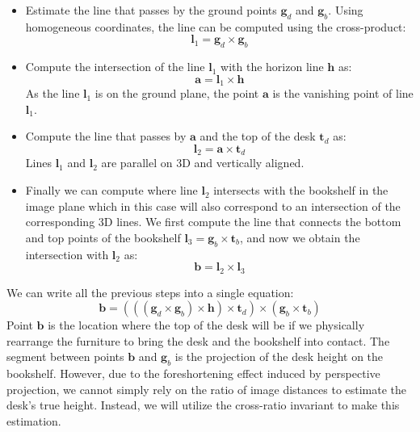 \begin{itemize}
\item Estimate the line that passes by the ground points $\mathbf{g}_d$ and $\mathbf{g}_b$. Using homogeneous coordinates, the line can be computed using the cross-product:
\begin{equation}
\boldsymbol{l}_1 = \mathbf{g}_d \times \mathbf{g}_b
\end{equation}

\item Compute the intersection of the line $\boldsymbol{l}_1$ with the horizon line $\mathbf{h}$ as:
\begin{equation}
\mathbf{a} = \boldsymbol{l}_1 \times \mathbf{h} 
\end{equation}
As the line $\boldsymbol{l}_1$ is on the ground plane, the point $\mathbf{a}$ is the vanishing point of line $\boldsymbol{l}_1$.

\item Compute the line that passes by $\mathbf{a}$ and the top of the desk $\mathbf{t}_d$ as:
\begin{equation}
\boldsymbol{l}_2 = \mathbf{a} \times \mathbf{t}_d
\end{equation}
Lines $\boldsymbol{l}_1$ and $\boldsymbol{l}_2$ are parallel on 3D and vertically aligned. 

\item Finally we can compute where line $\boldsymbol{l}_2$ intersects with the bookshelf in the image plane which in this case will also correspond to an intersection of the corresponding 3D lines. We first compute the line that connects the bottom and top points of the bookshelf $\boldsymbol{l}_3 = \mathbf{g}_b \times \mathbf{t}_b$, and now we obtain the intersection with $\boldsymbol{l}_2$ as:
\begin{equation}
\mathbf{b} = \boldsymbol{l}_2 \times \boldsymbol{l}_3 
\end{equation}
\end{itemize}

We can write all the previous steps into a single equation:
\begin{equation}
\mathbf{b} = (((\mathbf{g}_d \times \mathbf{g}_b) \times \mathbf{h}) \times \mathbf{t}_d) \times (\mathbf{g}_b \times \mathbf{t}_b) 
\end{equation}
Point $\mathbf{b}$ is the location where the top of the desk will be if we physically rearrange the furniture to bring the desk and the bookshelf into contact. The segment between points $\mathbf{b}$ and $\mathbf{g}_b$ is the projection of the desk height on the bookshelf. However, due to the foreshortening effect induced by perspective projection, we cannot simply rely on the ratio of image distances to estimate the desk's true height. Instead, we will utilize the cross-ratio invariant to make this estimation. 

